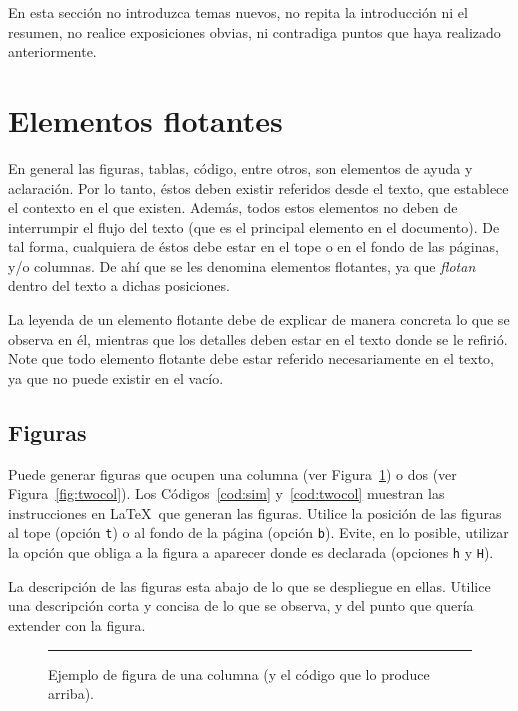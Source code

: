 \documentclass[twocolumn,11pts]{IEEEtran}
\begin{document}
En esta sección no introduzca temas nuevos, no repita la introducción ni el resumen, no realice exposiciones obvias, ni contradiga puntos que haya realizado anteriormente.

\section{Elementos flotantes}

En general las figuras, tablas, código, entre otros, son elementos de ayuda y aclaración. Por lo tanto, éstos deben existir referidos desde el texto, que establece el contexto en el que existen. Además, todos estos elementos no deben de interrumpir el flujo del texto (que es el principal elemento en el documento). De tal forma, cualquiera de éstos debe estar en el tope o en el fondo de las páginas, y/o columnas. De ahí que se les denomina elementos flotantes, ya que \emph{flotan} dentro del texto a dichas posiciones. 

La leyenda de un elemento flotante debe de explicar de manera concreta lo que se observa en él, mientras que los detalles deben estar en el texto donde se le refirió. Note que todo elemento flotante debe estar referido necesariamente en el texto, ya que no puede existir en el vacío.


\subsection{Figuras}
\label{sec:figuras}

Puede generar figuras que ocupen una columna (ver Figura~\ref{fig:sim}) o dos (ver Figura~\ref{fig:twocol}). Los Códigos~\ref{cod:sim} y~\ref{cod:twocol} muestran las instrucciones en \LaTeX\ que generan las figuras. Utilice la posición de las figuras al tope (opción \texttt{t}) o al fondo de la página (opción \texttt{b}). Evite, en lo posible, utilizar la opción que obliga a la figura a aparecer donde es declarada (opciones \texttt{h} y \texttt{H}).

La descripción de las figuras esta abajo de lo que se despliegue en ellas. Utilice una descripción corta y concisa de lo que se observa, y del punto que quería extender con la figura.

\begin{figure}[t]%
  \centering
  \rule{0.8\linewidth}{2cm}
  \caption{Ejemplo de figura de una columna (y el c\'odigo que lo produce arriba).}
  \label{fig:sim}
\end{figure}
\end{document}
